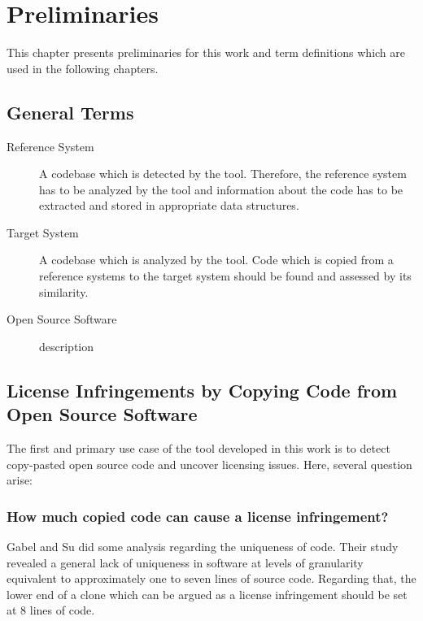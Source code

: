 
\chapter{Preliminaries}\label{chapter:preliminaries}
This chapter presents preliminaries for this work and term definitions which are used in the following chapters.

\section{General Terms}
\begin{description}
	\item[Reference System]
		A codebase which is detected by the tool. 
		Therefore, the reference system has to be analyzed by the tool and information about the code has to be extracted and stored in appropriate data structures.
	\item[Target System]
		A codebase which is analyzed by the tool. 
		Code which is copied from a reference systems to the target system should be found and assessed by its similarity.
	\item[Open Source Software] 
		description %
\end{description}

\section{License Infringements by Copying Code from Open Source Software}\label{section:preliminaries/infringement}
The first and primary use case of the tool developed in this work is to detect copy-pasted open source code and uncover licensing issues.
Here, several question arise:

\subsection*{How much copied code can cause a license infringement?}
Gabel and Su did some analysis regarding the uniqueness of code.
Their study \glqq revealed a general lack of uniqueness in software at levels of granularity equivalent to approximately one to seven lines of source code\grqq \cite{2010-gabel-su-source-code-uniqueness}.
Regarding that, the lower end of a clone which can be argued as a license infringement should be set at 8 lines of code.

